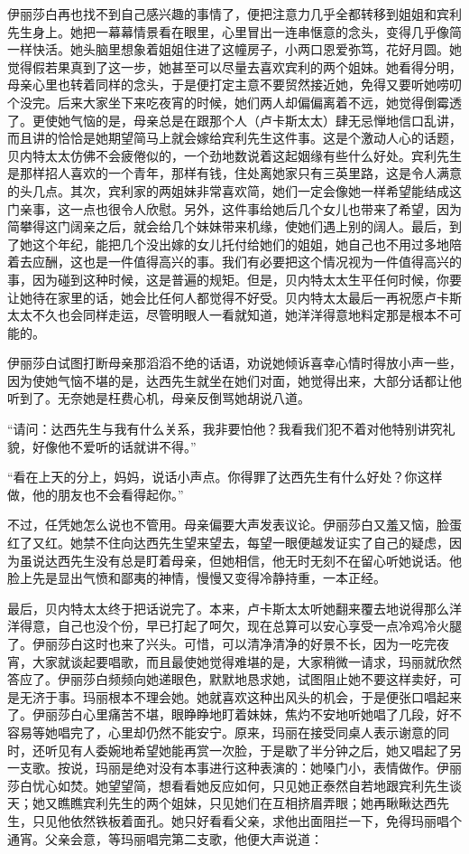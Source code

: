 \par 伊丽莎白再也找不到自己感兴趣的事情了，便把注意力几乎全都转移到姐姐和宾利先生身上。她把一幕幕情景看在眼里，心里冒出一连串惬意的念头，变得几乎像简一样快活。她头脑里想象着姐姐住进了这幢房子，小两口恩爱弥笃，花好月圆。她觉得假若果真到了这一步，她甚至可以尽量去喜欢宾利的两个姐妹。她看得分明，母亲心里也转着同样的念头，于是便打定主意不要贸然接近她，免得又要听她唠叨个没完。后来大家坐下来吃夜宵的时候，她们两人却偏偏离着不远，她觉得倒霉透了。更使她气恼的是，母亲总是在跟那个人（卢卡斯太太）肆无忌惮地信口乱讲，而且讲的恰恰是她期望简马上就会嫁给宾利先生这件事。这是个激动人心的话题，贝内特太太仿佛不会疲倦似的，一个劲地数说着这起姻缘有些什么好处。宾利先生是那样招人喜欢的一个青年，那样有钱，住处离她家只有三英里路，这是令人满意的头几点。其次，宾利家的两姐妹非常喜欢简，她们一定会像她一样希望能结成这门亲事，这一点也很令人欣慰。另外，这件事给她后几个女儿也带来了希望，因为简攀得这门阔亲之后，就会给几个妹妹带来机缘，使她们遇上别的阔人。最后，到了她这个年纪，能把几个没出嫁的女儿托付给她们的姐姐，她自己也不用过多地陪着去应酬，这也是一件值得高兴的事。我们有必要把这个情况视为一件值得高兴的事，因为碰到这种时候，这是普遍的规矩。但是，贝内特太太生平任何时候，你要让她待在家里的话，她会比任何人都觉得不好受。贝内特太太最后一再祝愿卢卡斯太太不久也会同样走运，尽管明眼人一看就知道，她洋洋得意地料定那是根本不可能的。
\par 伊丽莎白试图打断母亲那滔滔不绝的话语，劝说她倾诉喜幸心情时得放小声一些，因为使她气恼不堪的是，达西先生就坐在她们对面，她觉得出来，大部分话都让他听到了。无奈她是枉费心机，母亲反倒骂她胡说八道。
\par “请问：达西先生与我有什么关系，我非要怕他？我看我们犯不着对他特别讲究礼貌，好像他不爱听的话就讲不得。”
\par “看在上天的分上，妈妈，说话小声点。你得罪了达西先生有什么好处？你这样做，他的朋友也不会看得起你。”
\par 不过，任凭她怎么说也不管用。母亲偏要大声发表议论。伊丽莎白又羞又恼，脸蛋红了又红。她禁不住向达西先生望来望去，每望一眼便越发证实了自己的疑虑，因为虽说达西先生没有总是盯着母亲，但她相信，他无时无刻不在留心听她说话。他脸上先是显出气愤和鄙夷的神情，慢慢又变得冷静持重，一本正经。
\par 最后，贝内特太太终于把话说完了。本来，卢卡斯太太听她翻来覆去地说得那么洋洋得意，自己也没个份，早已打起了呵欠，现在总算可以安心享受一点冷鸡冷火腿了。伊丽莎白这时也来了兴头。可惜，可以清净清净的好景不长，因为一吃完夜宵，大家就谈起要唱歌，而且最使她觉得难堪的是，大家稍微一请求，玛丽就欣然答应了。伊丽莎白频频向她递眼色，默默地恳求她，试图阻止她不要这样卖好，可是无济于事。玛丽根本不理会她。她就喜欢这种出风头的机会，于是便张口唱起来了。伊丽莎白心里痛苦不堪，眼睁睁地盯着妹妹，焦灼不安地听她唱了几段，好不容易等她唱完了，心里却仍然不能安宁。原来，玛丽在接受同桌人表示谢意的同时，还听见有人委婉地希望她能再赏一次脸，于是歇了半分钟之后，她又唱起了另一支歌。按说，玛丽是绝对没有本事进行这种表演的：她嗓门小，表情做作。伊丽莎白忧心如焚。她望望简，想看看她反应如何，只见她正泰然自若地跟宾利先生谈天；她又瞧瞧宾利先生的两个姐妹，只见她们在互相挤眉弄眼；她再瞅瞅达西先生，只见他依然铁板着面孔。她只好看看父亲，求他出面阻拦一下，免得玛丽唱个通宵。父亲会意，等玛丽唱完第二支歌，他便大声说道：
